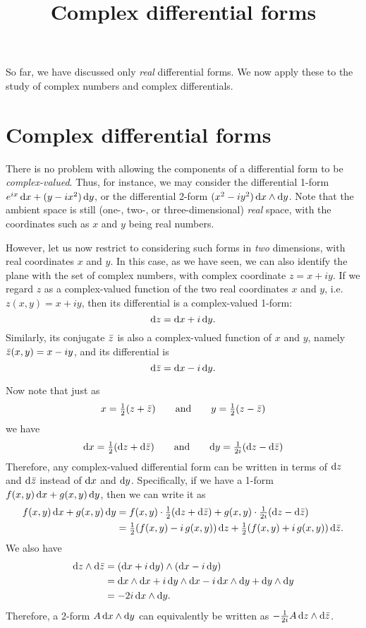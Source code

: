 \documentclass[12pt]{amsart}
\title{Complex differential forms}
\begin{document}
\maketitle

So far, we have discussed only \emph{real} differential forms.
We now apply these to the study of complex numbers and complex differentials.

\section{Complex differential forms}
\label{sec:complex-forms}

There is no problem with allowing the components of a differential form to be \emph{complex-valued}.
Thus, for instance, we may consider the differential 1-form $e^{ix} \,{\mathrm{d} x} + (y-ix^2)\,{\mathrm{d} y}$, or the differential 2-form $(x^2- i y^2)\,{\mathrm{d} x}\wedge{\ensuremath{\mathrm{d} y}}$.
Note that the ambient space is still (one-, two-, or three-dimensional) \emph{real} space, with the coordinates such as $x$ and $y$ being real numbers.

However, let us now restrict to considering such forms in \emph{two} dimensions, with real coordinates $x$ and $y$.
In this case, as we have seen, we can also identify the plane with the set of complex numbers, with complex coordinate $z = x+iy$.
If we regard $z$ as a complex-valued function of the two real coordinates $x$ and $y$, i.e.\ $z(x,y) = x+iy$, then its differential is a complex-valued 1-form:
\[ {\mathrm{d} z} = {\mathrm{d} x} + i \,{\mathrm{d} y}. \]
Similarly, its conjugate $\bar{z}$ is also a complex-valued function of $x$ and $y$, namely $\bar{z}(x,y) = x-iy$, and its differential is
\[ {\mathrm{d} \bar{z}} = {\mathrm{d} x} - i\, {\mathrm{d} y}. \]

Now note that just as
\[ x = \textstyle\frac{1}{2}(z+\bar{z}) \qquad\text{and}\qquad y = \textstyle\frac{1}{2}(z-\bar{z}) \]
we have
\[ {\mathrm{d} x} = \textstyle\frac{1}{2}({\mathrm{d} z}+{\mathrm{d} \bar{z}}) \qquad\text{and}\qquad {\ensuremath{\mathrm{d} y}} = \textstyle\frac{1}{2i}({\mathrm{d} z}-{\mathrm{d} \bar{z}}) \]
Therefore, any complex-valued differential form can be written in terms of ${\mathrm{d} z}$ and ${\mathrm{d} \bar{z}}$ instead of ${\mathrm{d} x}$ and ${\mathrm{d} y}$.
Specifically, if we have a 1-form $f(x,y) \,{\mathrm{d} x} + g(x,y) \,{\mathrm{d} y}$, then we can write it as
\begin{align*}
  f(x,y) \,{\mathrm{d} x} + g(x,y) \,{\mathrm{d} y}
  &= f(x,y)\cdot\textstyle\frac{1}{2}({\mathrm{d} z}+{\mathrm{d} \bar{z}}) +  g(x,y) \cdot\textstyle\frac{1}{2i}({\mathrm{d} z}-{\mathrm{d} \bar{z}})\\
  &= \textstyle\frac{1}{2} (f(x,y) -i\, g(x,y))\,{\mathrm{d} z} + \textstyle\frac{1}{2} (f(x,y) +i\, g(x,y))\,{\mathrm{d} \bar{z}}.
\end{align*}
We also have
\begin{align*}
  {\ensuremath{\mathrm{d} z}} \wedge{\ensuremath{\mathrm{d} \bar{z}}} &= ({\mathrm{d} x} + i \,{\mathrm{d} y}) \wedge ({\mathrm{d} x} - i \,{\mathrm{d} y})\\
  &= {\mathrm{d} x}\wedge{\ensuremath{\mathrm{d} x}} + i\,{\mathrm{d} y}\wedge{\ensuremath{\mathrm{d} x}} - i\,{\mathrm{d} x}\wedge{\ensuremath{\mathrm{d} y}} + {\mathrm{d} y}\wedge{\ensuremath{\mathrm{d} y}}\\
  &= -2i\, {\mathrm{d} x}\wedge{\ensuremath{\mathrm{d} y}}.
\end{align*}
Therefore, a 2-form $A\,{\mathrm{d} x}\wedge{\ensuremath{\mathrm{d} y}}$ can equivalently be written as $-\textstyle\frac{1}{2i} A\, {\mathrm{d} z}\wedge{\ensuremath{\mathrm{d} \bar{z}}}$.
\end{document}
